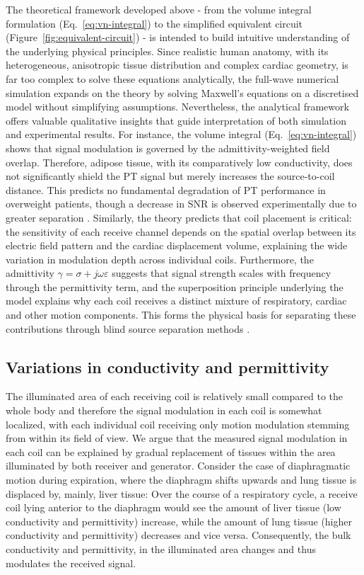 \documentclass[
]{article}
\begin{document}
The theoretical framework developed above - from the volume integral formulation (Eq.~\ref{eq:vn-integral}) to the simplified equivalent circuit (Figure~\ref{fig:equivalent-circuit}) - is intended to build intuitive understanding of the underlying physical principles. Since realistic human anatomy, with its heterogeneous, anisotropic tissue distribution and complex cardiac geometry, is far too complex to solve these equations analytically, the full-wave numerical simulation expands on the theory by solving Maxwell's equations on a discretised model without simplifying assumptions. Nevertheless, the analytical framework offers valuable qualitative insights that guide interpretation of both simulation and experimental results. For instance, the volume integral (Eq.~\ref{eq:vn-integral}) shows that signal modulation is governed by the admittivity-weighted field overlap. Therefore, adipose tissue, with its comparatively low conductivity, does not significantly shield the PT signal but merely increases the source-to-coil distance. This predicts no fundamental degradation of PT performance in overweight patients, though a decrease in SNR is observed experimentally due to greater separation \cite{Bacher2017CardiacStudy}. Similarly, the theory predicts that coil placement is critical: the sensitivity of each receive channel depends on the spatial overlap between its electric field pattern and the cardiac displacement volume, explaining the wide variation in modulation depth across individual coils. Furthermore, the admittivity $\gamma = \sigma + j\omega\varepsilon$ suggests that signal strength scales with frequency through the permittivity term, and the superposition principle underlying the model explains why each coil receives a distinct mixture of respiratory, cardiac and other motion components. This forms the physical basis for separating these contributions through blind source separation methods \cite{Bacher2020PerformanceFramework}.

\subsection{Variations in conductivity and
permittivity}\label{variations-in-conductivity-and-permittivity}

The illuminated area of each receiving coil is relatively small compared
to the whole body and therefore the signal modulation in each coil is
somewhat localized, with each individual coil receiving only motion
modulation stemming from within its field of view. We argue that the
measured signal modulation in each coil can be explained by gradual
replacement of tissues within the area illuminated by both receiver and
generator. Consider the case of diaphragmatic motion during expiration,
where the diaphragm shifts upwards and lung tissue is displaced by,
mainly, liver tissue: Over the course of a respiratory cycle, a receive
coil lying anterior to the diaphragm would see the amount of liver
tissue (low conductivity and permittivity) increase, while the amount of
lung tissue (higher conductivity and permittivity) decreases and vice
versa. Consequently, the bulk conductivity and permittivity, in the
illuminated area changes and thus modulates the received signal.
\end{document}
